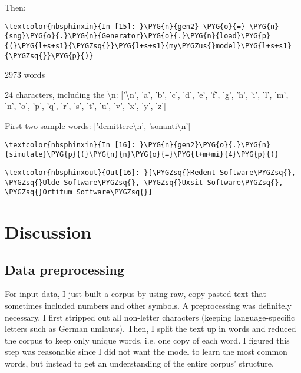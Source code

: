 \documentclass[letterpaper,10pt,english]{sphinxmanual}
\begin{document}
Then:

%
\begin{Verbatim}[commandchars=\\\{\}]
\textcolor{nbsphinxin}{In [15]: }\PYG{n}{gen2} \PYG{o}{=} \PYG{n}{sng}\PYG{o}{.}\PYG{n}{Generator}\PYG{o}{.}\PYG{n}{load}\PYG{p}{(}\PYG{l+s+s1}{\PYGZsq{}}\PYG{l+s+s1}{my\PYGZus{}model}\PYG{l+s+s1}{\PYGZsq{}}\PYG{p}{)}
\end{Verbatim}



%
\begin{OriginalVerbatim}[commandchars=\\\{\}]
2973 words

24 characters, including the \textbackslash{}n:
['\textbackslash{}n', 'a', 'b', 'c', 'd', 'e', 'f', 'g', 'h', 'i', 'l', 'm', 'n', 'o', 'p', 'q', 'r', 's', 't', 'u', 'v', 'x', 'y', 'z']

First two sample words:
['demittere\textbackslash{}n', 'sonanti\textbackslash{}n']
\end{OriginalVerbatim}
\relax

%
\begin{Verbatim}[commandchars=\\\{\}]
\textcolor{nbsphinxin}{In [16]: }\PYG{n}{gen2}\PYG{o}{.}\PYG{n}{simulate}\PYG{p}{(}\PYG{n}{n}\PYG{o}{=}\PYG{l+m+mi}{4}\PYG{p}{)}
\end{Verbatim}

%
\begin{Verbatim}[commandchars=\\\{\}]
\textcolor{nbsphinxout}{Out[16]: }[\PYGZsq{}Redent Software\PYGZsq{}, \PYGZsq{}Ulde Software\PYGZsq{}, \PYGZsq{}Uxsit Software\PYGZsq{}, \PYGZsq{}Ortitum Software\PYGZsq{}]
\end{Verbatim}


\chapter{Discussion}
\label{\detokenize{discussion:discussion}}\label{\detokenize{discussion::doc}}

\section{Data preprocessing}
\label{\detokenize{discussion:data-preprocessing}}
For input data, I just built a corpus by using raw, copy-pasted text that
sometimes included numbers and other symbols. A preprocessing was definitely
necessary. I first stripped out all non-letter characters (keeping
language-specific letters such as German umlauts). Then, I split the text up in
words and reduced the corpus to keep only unique words, i.e. one copy of each
word. I figured this step was reasonable since I did not want the model to learn
the most common words, but instead to get an understanding of the entire corpus’
structure.
\end{document}
